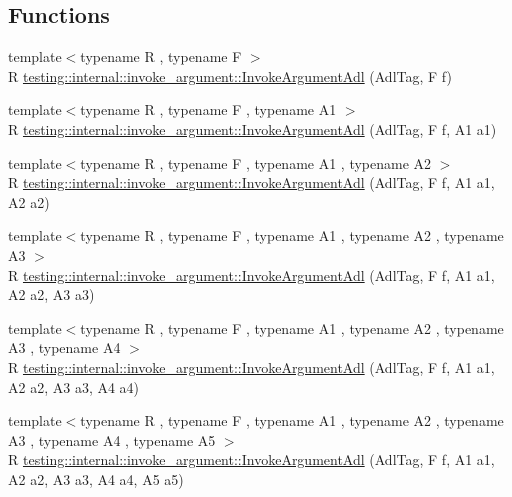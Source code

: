 \subsection*{Functions}
\begin{DoxyCompactItemize}
\item 
{\footnotesize template$<$typename R , typename F $>$ }\\R \mbox{\hyperlink{namespacetesting_1_1internal_1_1invoke__argument_a003f0228357c54422037bd3b448b355a}{testing\+::internal\+::invoke\+\_\+argument\+::\+Invoke\+Argument\+Adl}} (Adl\+Tag, F f)
\item 
{\footnotesize template$<$typename R , typename F , typename A1 $>$ }\\R \mbox{\hyperlink{namespacetesting_1_1internal_1_1invoke__argument_af07db25fc1b7486fb991495863bf1ab8}{testing\+::internal\+::invoke\+\_\+argument\+::\+Invoke\+Argument\+Adl}} (Adl\+Tag, F f, A1 a1)
\item 
{\footnotesize template$<$typename R , typename F , typename A1 , typename A2 $>$ }\\R \mbox{\hyperlink{namespacetesting_1_1internal_1_1invoke__argument_afe4a6811c2bcd0c6c51194b95e224f73}{testing\+::internal\+::invoke\+\_\+argument\+::\+Invoke\+Argument\+Adl}} (Adl\+Tag, F f, A1 a1, A2 a2)
\item 
{\footnotesize template$<$typename R , typename F , typename A1 , typename A2 , typename A3 $>$ }\\R \mbox{\hyperlink{namespacetesting_1_1internal_1_1invoke__argument_ae5e7bcffcae6a29e9c66298ead5ee91b}{testing\+::internal\+::invoke\+\_\+argument\+::\+Invoke\+Argument\+Adl}} (Adl\+Tag, F f, A1 a1, A2 a2, A3 a3)
\item 
{\footnotesize template$<$typename R , typename F , typename A1 , typename A2 , typename A3 , typename A4 $>$ }\\R \mbox{\hyperlink{namespacetesting_1_1internal_1_1invoke__argument_aace931066a0efe189d7a0c69f06b74ec}{testing\+::internal\+::invoke\+\_\+argument\+::\+Invoke\+Argument\+Adl}} (Adl\+Tag, F f, A1 a1, A2 a2, A3 a3, A4 a4)
\item 
{\footnotesize template$<$typename R , typename F , typename A1 , typename A2 , typename A3 , typename A4 , typename A5 $>$ }\\R \mbox{\hyperlink{namespacetesting_1_1internal_1_1invoke__argument_a371c08ae03d150520e8bda58fb4574c3}{testing\+::internal\+::invoke\+\_\+argument\+::\+Invoke\+Argument\+Adl}} (Adl\+Tag, F f, A1 a1, A2 a2, A3 a3, A4 a4, A5 a5)
\item 

\end{DoxyCompactItemize}
